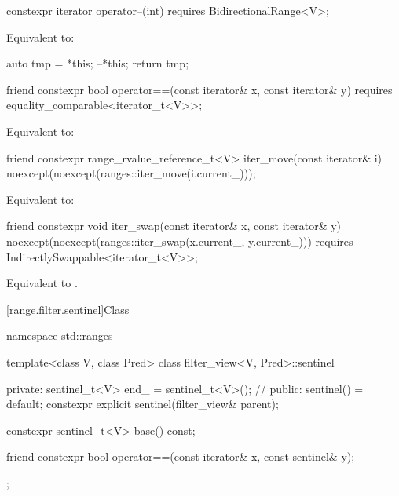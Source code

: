 %
\begin{itemdecl}
constexpr iterator operator--(int) requires BidirectionalRange<V>;
\end{itemdecl}

\begin{itemdescr}
\pnum
\effects Equivalent to:
\begin{codeblock}
auto tmp = *this;
--*this;
return tmp;
\end{codeblock}
\end{itemdescr}

%
\begin{itemdecl}
friend constexpr bool operator==(const iterator& x, const iterator& y)
  requires equality_comparable<iterator_t<V>>;
\end{itemdecl}

\begin{itemdescr}
\pnum
\effects Equivalent to: 
\end{itemdescr}

%
\begin{itemdecl}
friend constexpr range_rvalue_reference_t<V> iter_move(const iterator& i)
  noexcept(noexcept(ranges::iter_move(i.current_)));
\end{itemdecl}

\begin{itemdescr}
\pnum
\effects Equivalent to: 
\end{itemdescr}

%
\begin{itemdecl}
friend constexpr void iter_swap(const iterator& x, const iterator& y)
  noexcept(noexcept(ranges::iter_swap(x.current_, y.current_)))
  requires IndirectlySwappable<iterator_t<V>>;
\end{itemdecl}

\begin{itemdescr}
\pnum
\effects Equivalent to .
\end{itemdescr}

[range.filter.sentinel]{Class }

%
\begin{codeblock}
namespace std::ranges {
  template<class V, class Pred>
  class filter_view<V, Pred>::sentinel {
  private:
    sentinel_t<V> end_ = sentinel_t<V>();       // \expos
  public:
    sentinel() = default;
    constexpr explicit sentinel(filter_view& parent);

    constexpr sentinel_t<V> base() const;

    friend constexpr bool operator==(const iterator& x, const sentinel& y);
  };
}
\end{codeblock}

